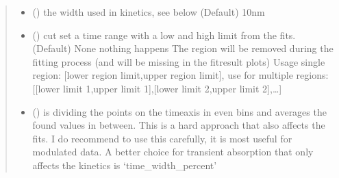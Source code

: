 \documentclass[letterpaper,10pt,english]{sphinxmanual}
\begin{document}
\begin{fulllineitems}
\begin{quote}
\begin{description}
\begin{itemize}
\item {} 
 (\sphinxstyleliteralemphasis{\sphinxupquote{, }}) \textendash{} the width used in kinetics, see below (Default) 10nm

\item {} 
 (\sphinxstyleliteralemphasis{\sphinxupquote{ (}}\sphinxstyleliteralemphasis{\sphinxupquote{)}}\sphinxstyleliteralemphasis{\sphinxupquote{, }}) \textendash{} cut set a time range with a low and high limit from the fits. (Default) None nothing happens
The region will be removed during the fitting process (and will be missing in the fit\sphinxhyphen{}result
plots)
Usage single region: {[}lower region limit,upper region limit{]},
use for multiple regions:{[}{[}lower limit 1,upper limit 1{]},{[}lower limit 2,upper limit 2{]},…{]}

\item {} 
 (\sphinxstyleliteralemphasis{\sphinxupquote{, }}) \textendash{} is dividing the points on the time\sphinxhyphen{}axis in even bins and averages the found values in between.
This is a hard approach that also affects the fits. I do recommend to use this carefully,
it is most useful for modulated data. A better choice for transient absorption that only
affects the kinetics is ‘time\_width\_percent’


\end{itemize}
\end{description}
\end{quote}
\end{fulllineitems}
\end{document}

